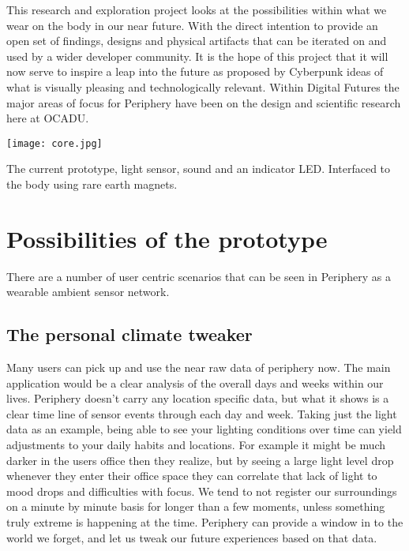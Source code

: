
This research and exploration project looks at the possibilities within what we wear on the body in our near future. With the direct intention to provide an open set of findings, designs and physical artifacts that can be iterated on and used by a wider developer community. It is the hope of this project that it will now serve to inspire a leap into the future as proposed by Cyberpunk ideas of what is visually pleasing and technologically relevant. Within Digital Futures the major areas of focus for Periphery have been on the design and scientific research here at OCADU.  

\begin{marginfigure}
  \texttt{[image: core.jpg]}
  \caption{The current prototype, light sensor, sound and an indicator LED. Interfaced to the body using rare earth magnets.}
  \label{fig:currentprototype}
\end{marginfigure}

\section{Possibilities of the prototype}
There are a number of user centric scenarios that can be seen in Periphery as a wearable ambient sensor network.

\subsection{The personal climate tweaker}\label{subsec:personalclimate}
Many users can pick up and use the near raw data of periphery now. The main application would be a clear analysis of the overall days and weeks within our lives. Periphery doesn't carry any location specific data, but what it shows is a clear time line of sensor events through each day and week. Taking just the light data as an example, being able to see your lighting conditions over time can yield adjustments to your daily habits and locations. For example it might be much darker in the users office then they realize, but by seeing a large light level drop whenever they enter their office space they can correlate that lack of light to mood drops and difficulties with focus. We tend to not register our surroundings on a minute by minute basis for longer than a few moments, unless something truly extreme is happening at the time. Periphery can provide a window in to the world we forget, and let us tweak our future experiences based on that data.


